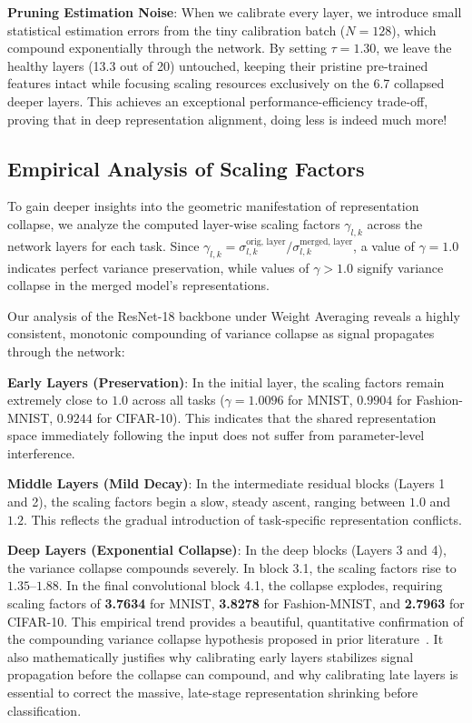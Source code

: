 \documentclass{article}
\theoremstyle{plain}
\theoremstyle{definition}
\theoremstyle{remark}
\begin{document}
\textbf{Pruning Estimation Noise}: When we calibrate every layer, we introduce small statistical estimation errors from the tiny calibration batch ($N=128$), which compound exponentially through the network. By setting $\tau = 1.30$, we leave the healthy layers (13.3 out of 20) untouched, keeping their pristine pre-trained features intact while focusing scaling resources exclusively on the 6.7 collapsed deeper layers. This achieves an exceptional performance-efficiency trade-off, proving that in deep representation alignment, doing less is indeed much more!

\subsection{Empirical Analysis of Scaling Factors}\enlargethispage{2\baselineskip}
\label{sec:scaling_factors}
To gain deeper insights into the geometric manifestation of representation collapse, we analyze the computed layer-wise scaling factors $\gamma_{l,k}$ across the network layers for each task. Since $\gamma_{l,k} = \sigma_{l,k}^{\text{orig, layer}} / \sigma_{l,k}^{\text{merged, layer}}$, a value of $\gamma = 1.0$ indicates perfect variance preservation, while values of $\gamma > 1.0$ signify variance collapse in the merged model's representations.

Our analysis of the ResNet-18 backbone under Weight Averaging reveals a highly consistent, monotonic compounding of variance collapse as signal propagates through the network:

\textbf{Early Layers (Preservation)}: In the initial layer, the scaling factors remain extremely close to $1.0$ across all tasks ($\gamma = 1.0096$ for MNIST, $0.9904$ for Fashion-MNIST, $0.9244$ for CIFAR-10). This indicates that the shared representation space immediately following the input does not suffer from parameter-level interference.

\textbf{Middle Layers (Mild Decay)}: In the intermediate residual blocks (Layers 1 and 2), the scaling factors begin a slow, steady ascent, ranging between $1.0$ and $1.2$. This reflects the gradual introduction of task-specific representation conflicts.

\textbf{Deep Layers (Exponential Collapse)}: In the deep blocks (Layers 3 and 4), the variance collapse compounds severely. In block 3.1, the scaling factors rise to $1.35$--$1.88$. In the final convolutional block 4.1, the collapse explodes, requiring scaling factors of \textbf{3.7634} for MNIST, \textbf{3.8278} for Fashion-MNIST, and \textbf{2.7963} for CIFAR-10.
This empirical trend provides a beautiful, quantitative confirmation of the compounding variance collapse hypothesis proposed in prior literature~\cite{jordan2022repair}. It also mathematically justifies why calibrating early layers stabilizes signal propagation before the collapse can compound, and why calibrating late layers is essential to correct the massive, late-stage representation shrinking before classification.
\end{document}
